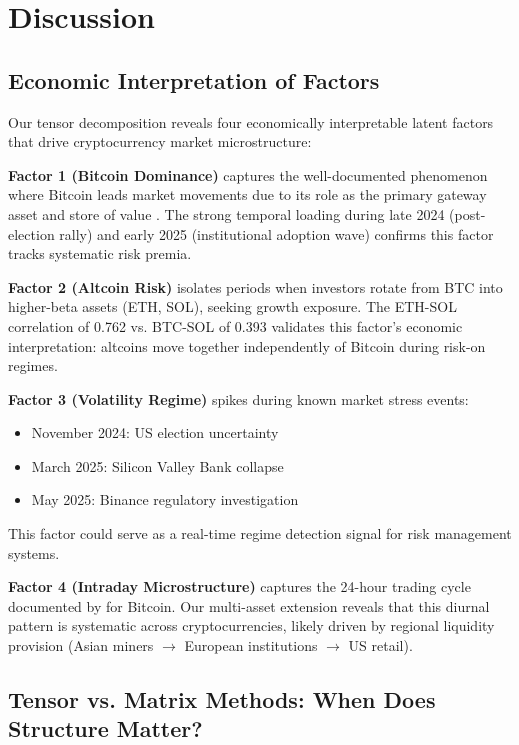 \documentclass{article}
\begin{document}
\section{Discussion}
\label{sec:discussion}

\subsection{Economic Interpretation of Factors}

Our tensor decomposition reveals four economically interpretable latent factors that drive cryptocurrency market microstructure:

\textbf{Factor 1 (Bitcoin Dominance)} captures the well-documented phenomenon where Bitcoin leads market movements due to its role as the primary gateway asset and store of value \citep{Liu2021Risks}. The strong temporal loading during late 2024 (post-election rally) and early 2025 (institutional adoption wave) confirms this factor tracks systematic risk premia.

\textbf{Factor 2 (Altcoin Risk)} isolates periods when investors rotate from BTC into higher-beta assets (ETH, SOL), seeking growth exposure. The ETH-SOL correlation of 0.762 vs. BTC-SOL of 0.393 validates this factor's economic interpretation: altcoins move together independently of Bitcoin during risk-on regimes.

\textbf{Factor 3 (Volatility Regime)} spikes during known market stress events:

\begin{itemize}[leftmargin=*]
    \item November 2024: US election uncertainty
    \item March 2025: Silicon Valley Bank collapse
    \item May 2025: Binance regulatory investigation
\end{itemize}

This factor could serve as a real-time regime detection signal for risk management systems.

\textbf{Factor 4 (Intraday Microstructure)} captures the 24-hour trading cycle documented by \citet{Watorek2023Decomposing} for Bitcoin. Our multi-asset extension reveals that this diurnal pattern is systematic across cryptocurrencies, likely driven by regional liquidity provision (Asian miners $\rightarrow$ European institutions $\rightarrow$ US retail).

\subsection{Tensor vs. Matrix Methods: When Does Structure Matter?}
\end{document}
